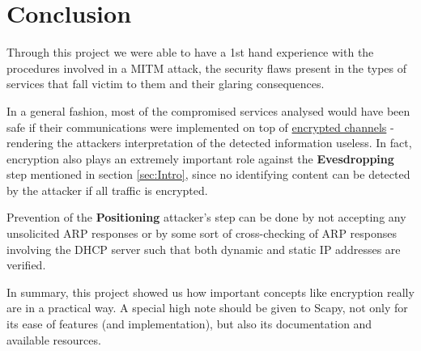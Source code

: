 \section{Conclusion}
\label{sec:Concl}

Through this project we were able to have a 1st hand experience with the 
procedures involved in a MITM attack, the security flaws present in the types
of services that fall victim to them and their glaring consequences.

In a general fashion, most of the compromised services analysed would have been 
safe if their communications were implemented on top of 
\underline{encrypted channels} - rendering the attackers interpretation of the 
detected information useless.
In fact, encryption also plays an extremely important role against the
\textbf{Evesdropping} step mentioned in section \ref{sec:Intro}, since no 
identifying content can be detected by the attacker if all traffic is encrypted.

Prevention of the \textbf{Positioning} attacker's step can be done by not 
accepting any unsolicited ARP responses or by some sort of cross-checking of 
ARP responses involving the DHCP server such that both dynamic and static IP
addresses are verified.

In summary, this project showed us how important concepts like encryption 
really are in a practical way.
A special high note should be given to Scapy, not only for its ease of features 
(and implementation), but also its documentation and available resources.
